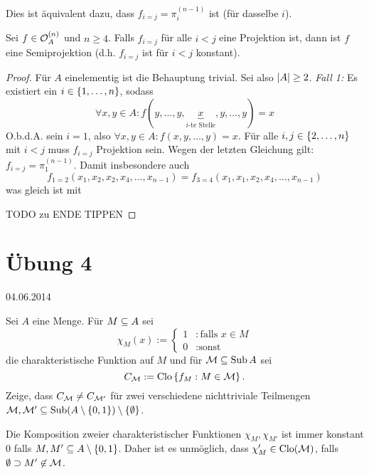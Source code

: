 \documentclass{book}
\begin{document}
\begin{remark}
    Dies ist äquivalent dazu, dass $f_{i=j}=\pi_i^{(n-1)}$ ist (für dasselbe $i$).
\end{remark}

\begin{lemma}\label{semi-proj-unique-proj}
    Sei $f\in\mathcal{O}_A^{(n)}$ und $n\geq 4$. Falls $f_{i=j}$ für alle $i<j$ eine Projektion ist, dann ist $f$ eine Semiprojektion (d.h. $f_{i=j}$ ist für $i<j$ konstant).
\end{lemma}

\begin{proof}
    Für $A$ einelementig ist die Behauptung trivial. Sei also $\left|A\right|\geq 2$.
    \emph{Fall 1:} Es existiert ein $i\in\left\{1,\ldots,n\right\}$, sodass
    $$
    \forall x,y\in A: f(y,\ldots,y,\underbrace{x}_{\textrm{$i$-te Stelle}},y,\ldots,y)=x
    $$
    O.b.d.A. sein $i=1$, also $\forall x,y\in A:f(x,y,\ldots,y)=x$.
    Für alle $i,j\in\left\{2,\ldots,n\right\}$ mit $i<j$ muss $f_{i=j}$ Projektion sein. Wegen der letzten Gleichung gilt: $f_{i=j}=\pi_1^{(n-1)}$. Damit insbesondere auch
    $$
    f_{1=2}(x_1,x_2,x_2,x_4,\ldots,x_{n-1})=f_{3=4}(x_1,x_1,x_2,x_4,\ldots,x_{n-1})
    $$
    was gleich ist mit
  
    TODO zu ENDE TIPPEN
\end{proof}

\section{Übung 4}\hfill 04.06.2014

\begin{exercise}
    Sei $A$ eine Menge. Für $M\subseteq A$ sei
    $$
    \chi_M(x):=
    \begin{cases}
        1 &: \textrm{falls $x\in M$}\\
        0 &: \textrm{sonst}
    \end{cases}
    $$
    die charakteristische Funktion auf $M$ und für $\mathcal{M}\subseteq\mathop\mathrm{Sub}\nolimits A$ sei
    $$
    C_{\mathcal{M}} := \mathrm{Clo}\left\{f_M:M\in\mathcal{M}\right\}.
    $$
    Zeige, dass $C_{\mathcal{M}}\neq C_{\mathcal{M}'}$ für zwei verschiedene nichttriviale Teilmengen $\mathcal{M},\mathcal{M}'\subseteq \mathop\mathrm{Sub}\nolimits(A\setminus\left\{0,1\right\})\setminus\left\{\emptyset\right\}$.
\end{exercise}
%
\begin{solution}
    Die Komposition zweier charakteristischer Funktionen $\chi_M, \chi_{M'}$ ist immer konstant $0$ falls $M,M'\subseteq A\setminus\left\{0,1\right\}$. Daher ist es unmöglich, dass $\chi_M'\in\mathrm{Clo}(\mathcal{M})$, falls $\emptyset\supset M'\not\in\mathcal{M}$.
\end{solution}
\end{document}
